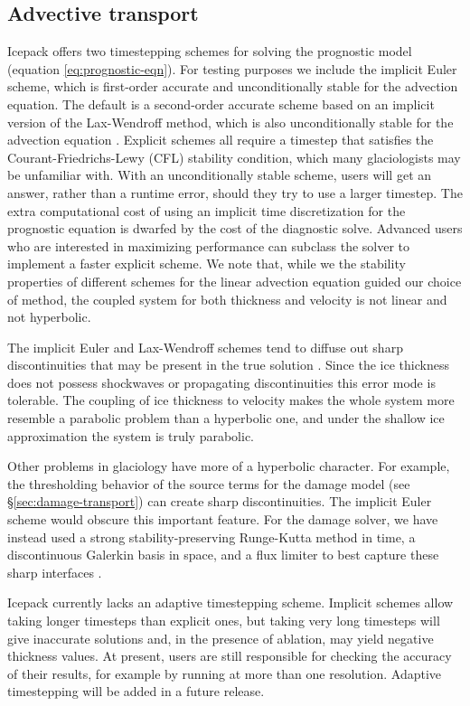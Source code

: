 \documentclass[journal abbreviation, manuscript]{copernicus}
\begin{document}
\subsection{Advective transport} \label{sec:prognostic-model}

Icepack offers two timestepping schemes for solving the prognostic model (equation \eqref{eq:prognostic-eqn}).
For testing purposes we include the implicit Euler scheme, which is first-order accurate and unconditionally stable for the advection equation.
The default is a second-order accurate scheme based on an implicit version of the Lax-Wendroff method, which is also unconditionally stable for the advection equation \citep{donea2003finite}.
Explicit schemes all require a timestep that satisfies the Courant-Friedrichs-Lewy (CFL) stability condition, which many glaciologists may be unfamiliar with.
With an unconditionally stable scheme, users will get an answer, rather than a runtime error, should they try to use a larger timestep.
The extra computational cost of using an implicit time discretization for the prognostic equation is dwarfed by the cost of the diagnostic solve.
Advanced users who are interested in maximizing performance can subclass the solver to implement a faster explicit scheme.
We note that, while we the stability properties of different schemes for the linear advection equation guided our choice of method, the coupled system for both thickness and velocity is not linear and not hyperbolic.

The implicit Euler and Lax-Wendroff schemes tend to diffuse out sharp discontinuities that may be present in the true solution \citep{donea2003finite}.
Since the ice thickness does not possess shockwaves or propagating discontinuities this error mode is tolerable.
The coupling of ice thickness to velocity makes the whole system more resemble a parabolic problem than a hyperbolic one, and under the shallow ice approximation the system is truly parabolic.

Other problems in glaciology have more of a hyperbolic character.
For example, the thresholding behavior of the source terms for the damage model (see \S\ref{sec:damage-transport}) can create sharp discontinuities.
The implicit Euler scheme would obscure this important feature.
For the damage solver, we have instead used a strong stability-preserving Runge-Kutta method in time, a discontinuous Galerkin basis in space, and a flux limiter to best capture these sharp interfaces \citep{shu1988efficient}.

Icepack currently lacks an adaptive timestepping scheme.
Implicit schemes allow taking longer timesteps than explicit ones, but taking very long timesteps will give inaccurate solutions and, in the presence of ablation, may yield negative thickness values.
At present, users are still responsible for checking the accuracy of their results, for example by running at more than one resolution.
Adaptive timestepping will be added in a future release.
\end{document}
